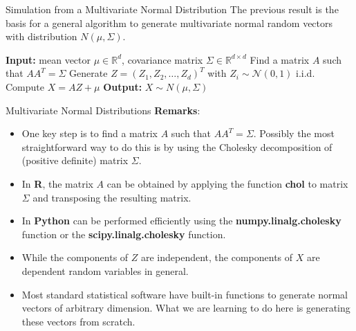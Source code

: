 \documentclass[8pt]{beamer}
\begin{document}
\begin{frame}{Simulation from a Multivariate Normal Distribution}
The previous result is the basis for a general algorithm to generate 
multivariate normal random vectors with distribution 
$N(\mu, \Sigma)$.

\vspace{2mm}

\begin{algorithm}[H]
\caption{Simulation from a Multivariate Normal Distribution}\label{alg:mvnormal}
\begin{algorithmic}[1]
  \State \textbf{Input:} mean vector $\mu \in \mathbb{R}^d$, covariance matrix $\Sigma \in \mathbb{R}^{d \times d}$
  \State Find a matrix $A$ such that $A A^T = \Sigma$ 
  \State Generate $Z = (Z_1, Z_2, \dots, Z_d)^T$ with $Z_i \sim \mathcal{N}(0,1)$ i.i.d.
  \State Compute $X = AZ + \mu$
  \State \textbf{Output:} $X \sim N(\mu, \Sigma)$
\end{algorithmic}
\end{algorithm}
\end{frame}

\begin{frame}{Multivariate Normal Distributions}
\textbf{Remarks}:
\begin{itemize}
	\item One key step is to find a matrix $A$ such that $AA^T=\Sigma$.
Possibly the most straightforward way to do this is by using the Cholesky decomposition of (positive definite) matrix $\Sigma$.
	\item In {\bf R}, the  matrix $A$ can be obtained by applying the function \textbf{chol} to matrix $\Sigma$ and transposing the resulting matrix. 
	\item In \textbf{Python} can be performed efficiently using the \textbf{numpy.linalg.cholesky} function or the \textbf{scipy.linalg.cholesky} function. 
	\item While the components of $Z$ are independent, the components of $X$ are dependent random variables in general.
	\item Most standard statistical software have built-in functions to generate normal vectors of arbitrary dimension. What we are learning to do here is generating these vectors from scratch.
\end{itemize}
\end{frame}
\end{document}
